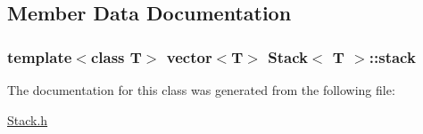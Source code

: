\subsection{Member Data Documentation}
\subsubsection[{\texorpdfstring{stack}{stack}}]{\setlength{\rightskip}{0pt plus 5cm}template$<$class T$>$ vector$<$T$>$ {\bf Stack}$<$ T $>$\+::stack\hspace{0.3cm}{\ttfamily [private]}}\hypertarget{classStack_aaf0fda0673d6b2d1670600ebe3b82f39}{}\label{classStack_aaf0fda0673d6b2d1670600ebe3b82f39}


The documentation for this class was generated from the following file\+:\begin{DoxyCompactItemize}
\item 
\hyperlink{Stack_8h}{Stack.\+h}\end{DoxyCompactItemize}
